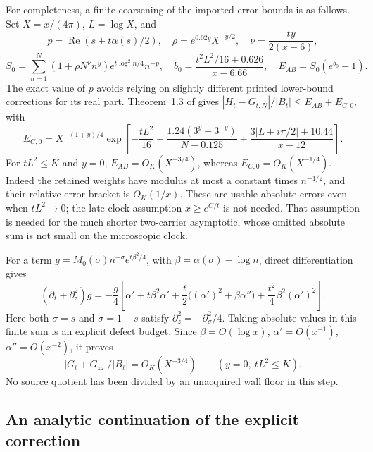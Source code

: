 For completeness, a finite coarsening of the imported error bounds is as
follows. Set $X=x/(4\pi)$, $L=\log X$, and
\[
 p=\operatorname{Re}(s+t\alpha(s)/2),\quad
 \rho=e^{0.02y}X^{-y/2},\quad \nu=\frac{ty}{2(x-6)},
\]
\[
 S_0=\sum_{n=1}^N(1+\rho N^\nu n^y)e^{t\log^2n/4}n^{-p},
 \quad b_0=\frac{t^2L^2/16+0.626}{x-6.66},\quad
 E_{AB}=S_0(e^{b_0}-1).
\]
The exact value of $p$ avoids relying on slightly different printed
lower-bound corrections for its real part. Theorem~1.3 of
\cite{polymath} gives $|H_t-G_{t,N}|/|B_t|\le E_{AB}+E_{C,0}$, with
\[
 E_{C,0}=X^{-(1+y)/4}
 \exp\!\left[-\frac{tL^2}{16}
 +\frac{1.24(3^y+3^{-y})}{N-0.125}
 +\frac{3|L+i\pi/2|+10.44}{x-12}\right].
\]
For $tL^2\le K$ and $y=0$, $E_{AB}=O_K(X^{-3/4})$, whereas
$E_{C,0}=O_K(X^{-1/4})$. Indeed the retained weights have modulus at most
a constant times $n^{-1/2}$, and their relative error bracket is $O_K(1/x)$.
These are usable absolute errors even when $tL^2\to0$; the late-clock
assumption $x\ge e^{C/t}$ is not needed. That assumption is needed for the
much shorter two-carrier asymptotic, whose omitted absolute sum is not small
on the microscopic clock.

For a term $g=M_0(\sigma)n^{-\sigma}e^{t\beta^2/4}$, with
$\beta=\alpha(\sigma)-\log n$, direct differentiation gives
\begin{equation}\label{eq:finite-reference-defect}
 (\partial_t+\partial_z^2)g=-\frac g4
 \left[\alpha'+t\beta^2\alpha'
 +\frac t2\bigl((\alpha')^2+\beta\alpha''\bigr)
 +\frac{t^2}{4}\beta^2(\alpha')^2\right].
\end{equation}
Here both $\sigma=s$ and $\sigma=1-s$ satisfy
$\partial_z^2=-\partial_\sigma^2/4$. Taking absolute values in this finite
sum is an explicit defect budget. Since $\beta=O(\log x)$,
$\alpha'=O(x^{-1})$, $\alpha''=O(x^{-2})$, it proves
\begin{equation}\label{eq:uncorrected-defect-order}
 |G_t+G_{zz}|/|B_t|=O_K(X^{-3/4})\qquad(y=0,\ tL^2\le K).
\end{equation}
No source quotient has been divided by an unacquired wall floor in this step.

\subsection{An analytic continuation of the explicit correction}

